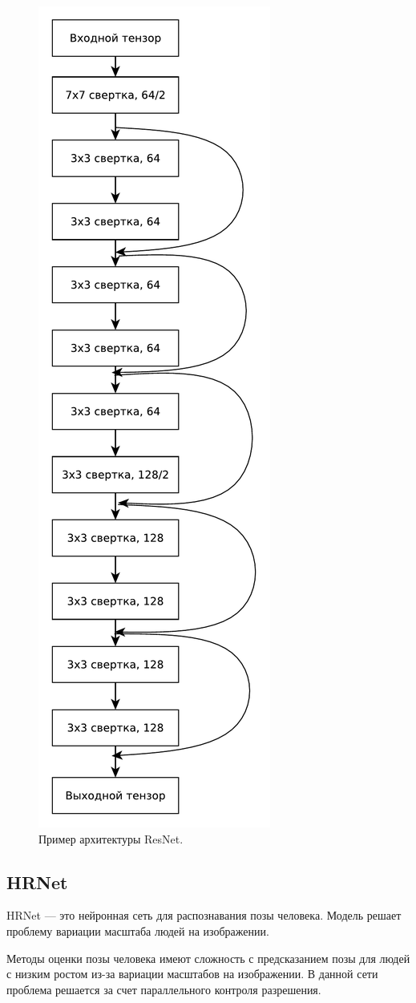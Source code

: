 \begin{figure}[ht!]
	\centering
	\includegraphics[width=0.4\linewidth]{assets/resnet.pdf}
	\caption{Пример архитектуры ResNet.}
	\label{fig:resnet-2}
\end{figure}

\subsection{HRNet}

HRNet \cite{Hrenet} --- это нейронная сеть для распознавания позы человека. Модель решает проблему вариации масштаба людей на изображении.

Методы оценки позы человека имеют сложность с предсказанием позы для людей с низким ростом из-за вариации масштабов на изображении. В данной сети проблема решается за счет параллельного контроля разрешения.

